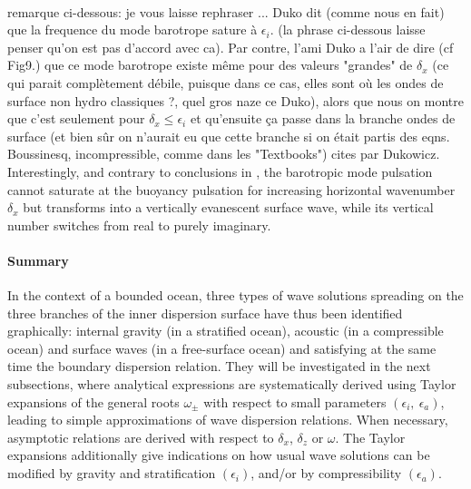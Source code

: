 \\
{\color{red}remarque ci-dessous: je vous laisse rephraser ... Duko dit (comme nous en fait) que la frequence du mode barotrope sature à $\epsilon_i$. (la phrase ci-dessous laisse penser qu'on est pas d'accord avec ca). Par contre, l'ami Duko a l'air de dire (cf Fig9.) que ce mode barotrope existe même pour des valeurs "grandes" de $\delta_x$ (ce qui parait complètement débile, puisque dans ce cas, elles sont où les ondes de surface non hydro classiques ?, quel gros naze ce Duko), alors que nous on montre que c'est seulement pour $\delta_x\le \epsilon_i$ et qu'ensuite ça passe dans la branche ondes de surface (et bien sûr on n'aurait eu que cette branche si on était partis des eqns.  Boussinesq, incompressible, comme dans les "Textbooks") cites par Dukowicz.}
Interestingly,  and contrary to conclusions in \cite{dukowicz_2013}, the barotropic mode pulsation cannot saturate at the buoyancy pulsation for increasing horizontal wavenumber $\delta_x$ but transforms into a vertically evanescent surface wave, while its vertical number switches from real to purely imaginary.
\paragraph{Summary}
In the context of a bounded ocean, three types of wave solutions spreading on the three branches of the inner dispersion surface have thus been identified graphically: internal gravity (in a stratified ocean), acoustic (in a compressible ocean) and surface waves (in a free-surface ocean) and satisfying at the same time the boundary dispersion relation. They will be investigated in the next subsections, where analytical expressions are systematically derived using Taylor expansions of the general roots $\omega_{\pm}$ with respect to small parameters $(\epsilon_i,\ \epsilon_a)$, leading to simple approximations of wave dispersion relations. When necessary, asymptotic relations are derived with respect to $\delta_x$, $\delta_z$ or $\omega$. The Taylor expansions additionally give indications on how usual wave solutions can be modified by gravity and stratification $(\epsilon_i)$, and/or by compressibility $(\epsilon_a)$.
